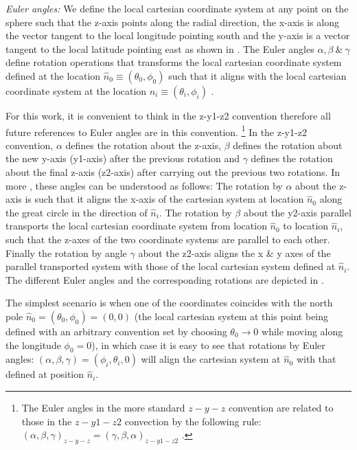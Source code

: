 \textit{Euler angles:}  We define the local cartesian coordinate system at any point on the sphere such that the z-axis points along the radial direction, the x-axis is along the vector tangent to the local longitude pointing south and the y-axis is a vector tangent to the local latitude pointing east as shown in . The Euler angles $\alpha ,\beta ~\&~ \gamma$ define rotation operations that transforms the local cartesian coordinate system defined at the location $\hat{n}_0 \equiv (\theta_0,\phi_0)$ such that it aligns with the local cartesian coordinate system at the location $\hat{n}_i \equiv (\theta_i,\phi_i)$ \cite{varshalovich}. 

For this work, it is convenient to think in the z-y1-z2 convention therefore all future references to Euler angles are in this convention. \footnote{The Euler angles in the more standard $z-y-z$ convention are related to those in the $z-y1-z2$ convection by the following rule: $(\alpha,\beta,\gamma)_{z-y-z} =(\gamma,\beta,\alpha)_{z-y1-z2}$ \cite{varshalovich}.}
In the z-y1-z2 convention, $\alpha$ defines the rotation about the z-axis, $\beta$ defines the rotation about the new y-axis (y1-axis) after the previous rotation and $\gamma$ defines the rotation about the final z-axis (z2-axis) after carrying out the previous two rotations. In more , these angles can be understood as follows: The rotation by $\alpha$ about the z-axis is such that it aligns the x-axis of the cartesian system at location $\hat{n}_0$ along the great circle in the direction of $\hat{n}_i$.  The rotation by $\beta$ about the y2-axis parallel transports the local cartesian coordinate system from location $\hat{n}_0$ to location $\hat{n}_i$, such that the z-axes of the two coordinate systems are parallel to each other. Finally the rotation by angle $\gamma$ about the z2-axis aligns the x \& y axes of the parallel transported system with those of the local cartesian system defined at $\hat{n}_i$. The different Euler angles and the corresponding rotations are depicted in .

The simplest scenario is when one of the coordinates coincides with the north pole $\hat{n}_0=(\theta_0,\phi_0)=(0,0)$ (the local cartesian system at this point being defined with an arbitrary convention set by choosing $\theta_0 \rightarrow 0$ while moving along the longitude $\phi_0=0$), in which case it is easy to see that rotations by Euler angles: $(\alpha,\beta,\gamma) =(\phi_i,\theta_i,0)$ will align the cartesian system at $\hat{n}_0$ with that defined at position $\hat{n}_i$. 
